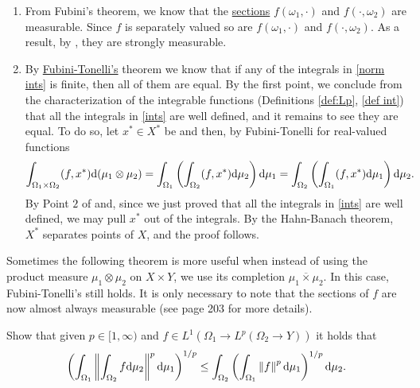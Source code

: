\documentclass[
    a4paper,
    DIV=14,
    abstract=true,
    numbers=noenddot
]{scrartcl}
\begin{document}
\begin{hint}
	\begin{enumerate}
		\item From Fubini's theorem, we know that the \href{https://proofwiki.org/wiki/Horizontal_Section_of_Measurable_Function_is_Measurable}{sections} $f(\omega_1,\cdot )$ and $f(\cdot,\omega_2)$ are measurable. Since $f$ is separately valued so are $f(\omega_1,\cdot )$ and $f(\cdot,\omega_2)$. As a result, by , they are strongly measurable.

		\item By \href{https://en.wikipedia.org/wiki/Fubini%27s_theorem#Fubini%E2%80%93Tonelli_theorem:~:text=the%20uncompleted%20product.-,For,-integrable%20functions%5B}{Fubini-Tonelli's} theorem we know that if any of the integrals in \eqref{norm ints} is finite, then all of them are equal. By the first point, we conclude from the characterization of the integrable functions (Definitions \ref{def:Lp}, \ref{def int}) that all the integrals in \eqref{ints} are well defined, and it remains to see they are equal. To do so, let $x^* \in X^*$ be and then, by Fubini-Tonelli for real-valued functions
		      \begin{align*}
			      \int_{\Omega_1 \times \Omega _2} (f,x^*) \mathrm{d} (\mu_1 \otimes \mu _2) & = \int_{\Omega_1}\left(\int_{\Omega_2} (f,x^*)\mathrm{d}\mu_2\right)\mathrm{d}\mu_1=\int_{\Omega_2}\left(\int_{\Omega_1} (f,x^*)\mathrm{d}\mu_1\right)\mathrm{d}\mu_2.
		      \end{align*}
		      By Point $2$ of  and, since we just proved that all the integrals in \eqref{ints} are well defined, we may pull $x^*$ out of the integrals. By the Hahn-Banach theorem, $X^*$ separates points of $X$, and the proof follows.
	\end{enumerate}
\end{hint}
Sometimes the following theorem is more useful when instead of using the product measure $\mu_1 \otimes \mu_2$ on $X \times Y$, we use its completion $\overline{\mu_1 \times \mu_2}$. In this case, Fubini-Tonelli's  still holds. It is only necessary to note that the sections of $f$ are now almost always measurable (see \cite{tao2011introduction} page 203 for more details).
\begin{exercise}
	Show that given $p \in [1,\infty)$ and $f \in L^1(\Omega_1 \to L^p(\Omega_2 \to Y))$ it holds that
	\begin{align*}
		\left(\int_{\Omega _1}\left\lVert \int_{\Omega_2 } f \mathrm{d} \mu _2  \right\rVert^p \mathrm{d} \mu _1\right)^{1/p}\leq \int_{\Omega_2}\left(\int_{\Omega _1} \left\lVert f \right\rVert^p \mathrm{d} \mu_1\right)^{1/p}\mathrm{d} \mu_2 .
	\end{align*}
\end{exercise}
\end{document}
